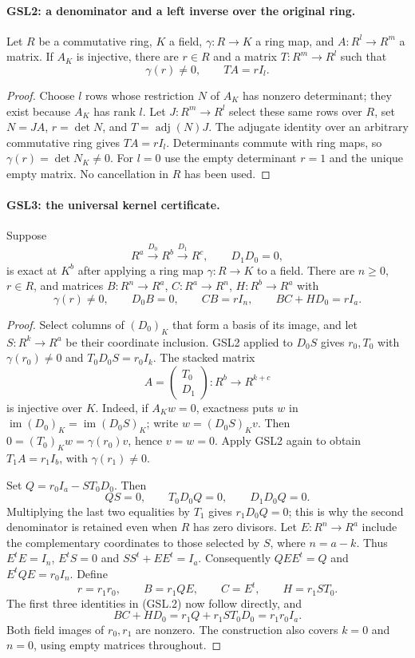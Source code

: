 \paragraph{GSL2: a denominator and a left inverse over the original ring.}
\label{claim:GSL2}
Let $R$ be a commutative ring, $K$ a field, $\gamma:R\to K$ a ring
map, and $A:R^l\to R^m$ a matrix.  If $A_K$ is injective, there are
$r\in R$ and a matrix $T:R^m\to R^l$ such that
\[
 \gamma(r)\ne0,\qquad TA=rI_l. \tag{GSL.1}
\]

\begin{proof}
Choose $l$ rows whose restriction $N$ of $A_K$ has nonzero determinant;
they exist because $A_K$ has rank $l$.  Let $J:R^m\to R^l$ select
these same rows over $R$, set $N=JA$, $r=\det N$, and
$T=\operatorname{adj}(N)J$.  The adjugate identity over an arbitrary
commutative ring gives $TA=rI_l$.  Determinants commute with ring maps,
so $\gamma(r)=\det N_K\ne0$.  For $l=0$ use the empty determinant
$r=1$ and the unique empty matrix.  No cancellation in $R$ has been used.
\end{proof}

\paragraph{GSL3: the universal kernel certificate.}
\label{claim:GSL3}
Suppose
\[
 R^a\xrightarrow{D_0}R^b\xrightarrow{D_1}R^c,
 \qquad D_1D_0=0,
\]
is exact at $K^b$ after applying a ring map $\gamma:R\to K$ to a
field.  There are $n\ge0$, $r\in R$, and matrices
$B:R^n\to R^a$, $C:R^a\to R^n$, $H:R^b\to R^a$ with
\[
 \gamma(r)\ne0,\qquad
 D_0B=0,\qquad CB=rI_n,\qquad BC+HD_0=rI_a. \tag{GSL.2}
\]

\begin{proof}
Select columns of $(D_0)_K$ that form a basis of its image, and let
$S:R^k\to R^a$ be their coordinate inclusion.  GSL2 applied to $D_0S$
gives $r_0,T_0$ with $\gamma(r_0)\ne0$ and
$T_0D_0S=r_0I_k$.  The stacked matrix
\[
 A=\begin{pmatrix}T_0\\D_1\end{pmatrix}:R^b\longrightarrow R^{k+c}
\]
is injective over $K$.  Indeed, if $A_Kw=0$, exactness puts $w$ in
$\operatorname{im}(D_0)_K=\operatorname{im}(D_0S)_K$; write
$w=(D_0S)_Kv$.  Then $0=(T_0)_Kw=\gamma(r_0)v$, hence $v=w=0$.
Apply GSL2 again to obtain $T_1A=r_1I_b$, with $\gamma(r_1)\ne0$.

Set $Q=r_0I_a-ST_0D_0$.  Then
\[
 QS=0,\qquad T_0D_0Q=0,\qquad D_1D_0Q=0.
\]
Multiplying the last two equalities by $T_1$ gives $r_1D_0Q=0$;
this is why the second denominator is retained even when $R$ has
zero divisors.  Let $E:R^n\to R^a$ include the complementary
coordinates to those selected by $S$, where $n=a-k$.  Thus
$E^tE=I_n$, $E^tS=0$ and $SS^t+EE^t=I_a$.  Consequently
$QEE^t=Q$ and $E^tQE=r_0I_n$.  Define
\[
 r=r_1r_0,\qquad B=r_1QE,\qquad C=E^t,\qquad H=r_1ST_0.
\]
The first three identities in (GSL.2) now follow directly, and
\[
 BC+HD_0=r_1Q+r_1ST_0D_0=r_1r_0I_a.
\]
Both field images of $r_0,r_1$ are nonzero.  The construction also
covers $k=0$ and $n=0$, using empty matrices throughout.
\end{proof}

